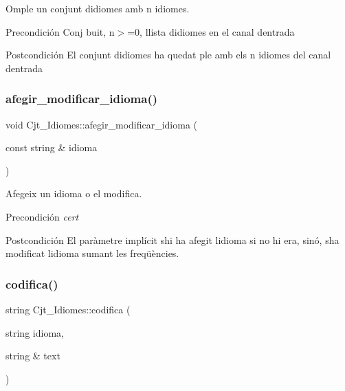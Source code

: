 Omple un conjunt d\textquotesingle{}idiomes amb n idiomes. 

\begin{DoxyPrecond}{Precondición}
Conj buit, n$>$=0, llista d\textquotesingle{}idiomes en el canal d\textquotesingle{}entrada 
\end{DoxyPrecond}
\begin{DoxyPostcond}{Postcondición}
El conjunt d\textquotesingle{}idiomes ha quedat ple amb els n idiomes del canal d\textquotesingle{}entrada 
\end{DoxyPostcond}
\mbox{\label{class_cjt___idiomes_a9e75f643c62886df635403bd3108c1df}} 
\subsubsection{\texorpdfstring{afegir\+\_\+modificar\+\_\+idioma()}{afegir\_modificar\_idioma()}}
{\footnotesize\ttfamily void Cjt\+\_\+\+Idiomes\+::afegir\+\_\+modificar\+\_\+idioma (\begin{DoxyParamCaption}\item[{const string \&}]{idioma }\end{DoxyParamCaption})}



Afegeix un idioma o el modifica. 

\begin{DoxyPrecond}{Precondición}
{\itshape cert} 
\end{DoxyPrecond}
\begin{DoxyPostcond}{Postcondición}
El paràmetre implícit s\textquotesingle{}hi ha afegit l\textquotesingle{}idioma si no hi era, sinó, s\textquotesingle{}ha modificat l\textquotesingle{}idioma sumant les freqüències. 
\end{DoxyPostcond}
\mbox{\label{class_cjt___idiomes_a745de8e5d29e235cb1e2142d8acaaad9}} 
\subsubsection{\texorpdfstring{codifica()}{codifica()}}
{\footnotesize\ttfamily string Cjt\+\_\+\+Idiomes\+::codifica (\begin{DoxyParamCaption}\item[{string}]{idioma,  }\item[{string \&}]{text }\end{DoxyParamCaption})}



